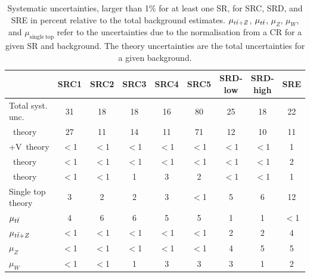 			\begin{table}[htpb]
				\caption{Systematic uncertainties, larger than 1\% for at
			    least one \ac{SR}, for SRC, SRD, and SRE in percent relative to the total 
			    background estimates. $\mu_{t\bar{t}+Z}$, $\mu_{t\bar{t}}$, $\mu_{Z}$, $\mu_{W}$,
			    and $\mu_{\mathrm{single~top}}$ refer to the uncertainties due to the normalisation
			    from a \ac{CR} for a given \ac{SR} and background. The theory uncertainties are the
			    total uncertainties for a given background.}%
			    \label{tab:systSRCDE}
				\begin{center}
				\renewcommand{\arraystretch}{1.2}			
					\begin{tabular}{lcccccccc}
						\toprule
						 & {\textbf{SRC1}} & {\textbf{SRC2}} & {\textbf{SRC3}} & {\textbf{SRC4}} & {\textbf{SRC5}} & {\textbf{SRD-low}} & {\textbf{SRD-high}} & {\textbf{SRE}}\\ \midrule 
						{Total syst. unc.} & 31 & 18 & 18 & 16 & 80 & 25 & 18 & 22\\ \midrule  
						{\ttbar\ theory} & 27 & 11 & 14 & 11 & 71 & 12 & 10 & 11\\  
						{\ttbar+V\ theory} & {$<$1\phantom{15}} & {$<$1\phantom{15}} & {$<$1\phantom{15}} & {$<$1\phantom{15}} & {$<$1\phantom{15}} & {$<$1\phantom{15}} & {$<$1\phantom{15}} & 1\\  
						{\Zboson\ theory} & {$<$1\phantom{15}} & {$<$1\phantom{15}} & {$<$1\phantom{15}} & {$<$1\phantom{15}} & {$<$1\phantom{15}} & {$<$1\phantom{15}} & {$<$1\phantom{15}} & 2\\  
						{\Wboson\ theory} & {$<$1\phantom{15}} & {$<$1\phantom{15}} & 1 & 3 & 2 & {$<$1\phantom{15}} & {$<$1\phantom{15}} & 1\\  
						{Single top theory} & 3 & 2 & 2 & 3 & {$<$1\phantom{15}} & 5 & 6 & 12\\  
						{$\mu_{t\bar{t}}$} & 4 & 6 & 6 & 5 & 5 & 1 & 1 & {$<$1\phantom{15}}\\  
						{$\mu_{t\bar{t}+Z}$} & {$<$1\phantom{15}} & {$<$1\phantom{15}} & {$<$1\phantom{15}} & {$<$1\phantom{15}} & {$<$1\phantom{15}} & 2 & 2 & 4\\  
						{$\mu_{Z}$} & {$<$1\phantom{15}} & {$<$1\phantom{15}} & {$<$1\phantom{15}} & {$<$1\phantom{15}} & {$<$1\phantom{15}} & 4 & 5 & 5\\  
						{$\mu_{W}$} & {$<$1\phantom{15}} & {$<$1\phantom{15}} & 1 & 3 & 3 & 3 & 1 & 2\\  

\end{tabular}
\end{center}
\end{table}

